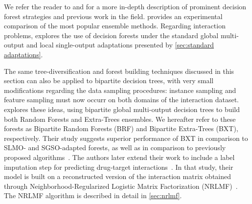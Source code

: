 We refer the reader to  and  for a more in-depth description of prominent decision forest strategies and previous work in the field.  provides an experimental comparison of the most popular ensemble methods.  %
%
Regarding interaction problems,  explores the use of decision forests under the standard global multi-output and local single-output adaptations presented by \autoref{sec:standard adaptations}.

The same tree-diversification and forest building techniques discussed in this section can also be applied to bipartite decision trees, with very small modifications regarding the data sampling procedures: instance sampling and feature sampling must now occurr on both domains of the interaction dataset.
%
\cite{pliakos2019network} explores these ideas, using bipartite global multi-output decision trees to build both Random Forests and Extra-Trees ensembles. We hereafter refer to these forests as Bipartite Random Forests (BRF) and Bipartite Extra-Trees (BXT), respectively. Their study suggests superior performance of BXT in comparison to SLMO- and SGSO-adapted forests, as well as in comparison to previously proposed algorithms~\cite{pliakos2019network}. %
%
The authors later extend their work to include a label imputation step for predicting drug-target interactions~\cite{pliakos2020drugtarget}. In that study, their model is built on a reconstructed version of the interaction matrix obtained through Neighborhood-Regularized Logistic Matrix Factorization (NRLMF)~\cite{liu2016neighborhood}. The NRLMF algorithm is described in detail in \autoref{sec:nrlmf}.


